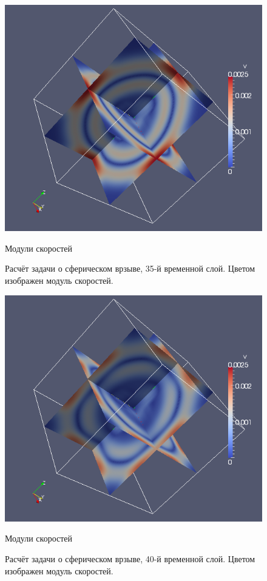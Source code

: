 \begin{figure}[htp]
\centering
\includegraphics[width=\textwidth]{png/spherical-explosion-test/v-scalar/0035.png}
\caption{Модули скоростей}
\caption{Расчёт задачи о сферическом врзыве, 35-й временной слой. Цветом изображен модуль скоростей.}
\end{figure}

\begin{figure}[htp]
\centering
\includegraphics[width=\textwidth]{png/spherical-explosion-test/v-scalar/0040.png}
\caption{Модули скоростей}
\caption{Расчёт задачи о сферическом врзыве, 40-й временной слой. Цветом изображен модуль скоростей.}
\end{figure}

